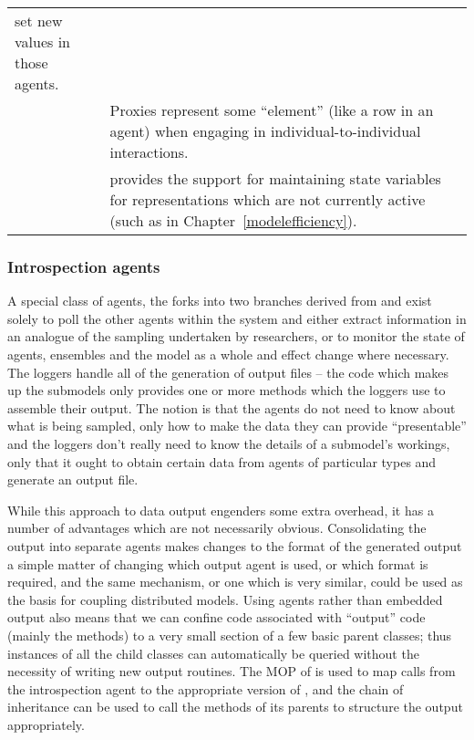 \begin{table}[H]
\begin{center}
\begin{tabular}{l L{7cm}}
    set new values in those agents.\\
     & Proxies represent some ``element'' (like a row in an
     agent) when engaging in individual-to-individual
    interactions.\\
     & provides the support for maintaining
    state variables for representations which are not currently active
    (such as in Chapter~\ref{modelefficiency}).\\
    \bottomrule
  \end{tabular}
\end{center}
\end{table}


\subsubsection{Introspection agents}
A special class of agents, the  forks into two
branches derived from  and  exist
solely to poll the other agents within the system and either extract
information in an analogue of the sampling undertaken by researchers,
or to monitor the state of agents, ensembles and the model as a whole
and effect change where necessary. The loggers handle all of the
generation of output files -- the code which makes up the submodels
only provides one or more  methods which the loggers
use to assemble their output.  The notion is that the agents do not
need to know about what is being sampled, only how to make the data
they can provide ``presentable'' and the loggers don't really need to
know the details of a submodel's workings, only that it ought to
obtain certain data from agents of particular types and generate an
output file.

While this approach to data output engenders some extra overhead, it
has a number of advantages which are not necessarily
obvious. Consolidating the output into separate agents makes changes
to the format of the generated output a simple matter of changing
which output agent is used, or which format is required, and the same
mechanism, or one which is very similar, could be used as the basis
for coupling distributed models.  Using \mlogger agents rather than
embedded output also means that we can confine code associated with
``output'' code (mainly the  methods) to a very small
section of a few basic parent classes; thus instances of all the child
classes can automatically be queried without the necessity of writing
new output routines.  The MOP of \SCLOS is used to map calls from the
introspection agent to the appropriate version of ,
and the chain of inheritance can be used to call the 
methods of its parents to structure the output appropriately.

